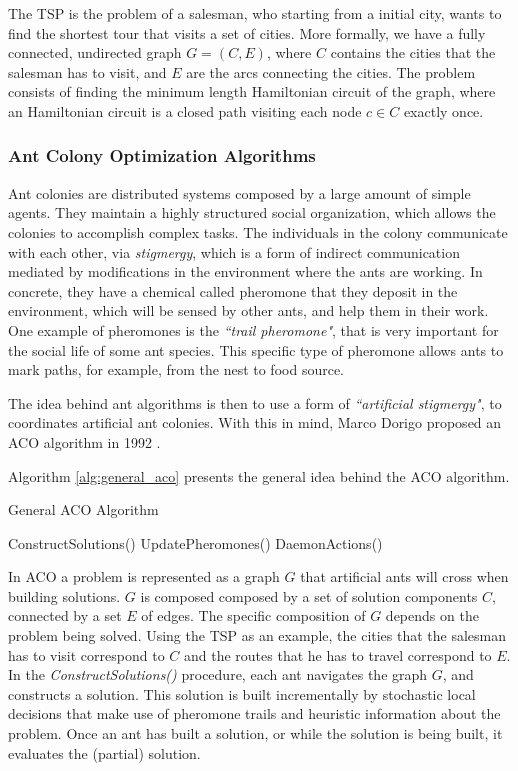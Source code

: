 		The TSP is the problem of a salesman, who starting from a initial city, wants to find the shortest tour that visits a set of cities. More formally, we have a fully connected, undirected graph $G=(C,E)$, where $C$ contains the cities that the salesman has to visit, and $E$ are the arcs connecting the cities. The problem consists of finding the minimum length Hamiltonian circuit of the graph, where an Hamiltonian circuit is a closed path visiting each node $c \in C$ exactly once.
		\subsubsection*{Ant Colony Optimization Algorithms}
		\label{subsubsec:ant_algorithms}

		Ant colonies are distributed systems \cite{acobook} composed by a large amount of simple agents. They maintain a highly structured social organization, which allows the colonies to accomplish complex tasks. The individuals in the colony communicate with each other, via \emph{stigmergy}, which is a form of indirect communication mediated by modifications in the environment where the ants are working. In concrete, they have a chemical called pheromone that they deposit in the environment, which will be sensed by other ants, and help them in their work. One example of pheromones is the \emph{``trail pheromone"}, that is very important for the social life of some ant species. This specific type of pheromone allows ants to mark paths, for example, from the nest to food source.
	
		The idea behind ant algorithms is then to use a form of \emph{``artificial stigmergy"}, to coordinates artificial ant colonies. With this in mind, Marco Dorigo proposed an ACO algorithm in 1992 \cite{dorigo92}. 	

		Algorithm \ref{alg:general_aco} presents the general idea behind the ACO algorithm.
				\begin{algorithm}
					\caption{General ACO Algorithm}
					\label{alg:general_aco}
					\begin{algorithmic}
						\STATE ConstructSolutions()
						\STATE UpdatePheromones() 
						\STATE DaemonActions() 
					\ENDWHILE
					\end{algorithmic}
				\end{algorithm}
				
				In ACO a problem is represented as a graph $G$ that artificial ants will cross when building solutions. $G$ is composed composed by a set of solution components $C$, connected by a set $E$ of edges. The specific composition of $G$ depends on the problem being solved.
				 Using the TSP as an example, the cities that the salesman has to visit correspond to $C$ and the routes that he has to travel correspond to $E$.			
				In the \emph{ConstructSolutions()} procedure, each ant navigates the graph $G$, and constructs a solution. This solution is built incrementally by stochastic local decisions that make use of pheromone trails and heuristic information about the problem. Once an ant has built a solution, or while the solution is being built, it evaluates the (partial) solution.
				
